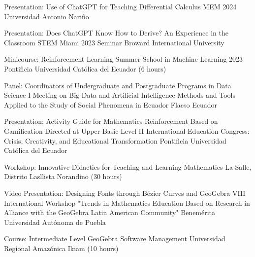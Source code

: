 \documentclass[
    a4paper,
    maincolor=cvblue!70!blue,
    sidecolor=gray!30,
    sectioncolor=cvblue!70!blue,
    sidebarwidth=7.5cm,
    topbottommargin=20pt,
    leftrightmargin=20pt,
]{fortysecondscv}
\begin{document}
    {Presentation: Use of ChatGPT for Teaching Differential Calculus}
    {MEM 2024}
    {Universidad Antonio Nariño}
    
    
    {Presentation: Does ChatGPT Know How to Derive? An Experience in the Classroom}
    {STEM Miami 2023 Seminar}
    {Broward International University}
    
    
    {Minicourse: Reinforcement Learning}
    {Summer School in Machine Learning 2023}
    {Pontificia Universidad Católica del Ecuador (6 hours)}
    
    
    {Panel: Coordinators of Undergraduate and Postgraduate Programs in Data Science}
    {I Meeting on Big Data and Artificial Intelligence Methods and Tools Applied to the Study of Social Phenomena in Ecuador}
    {Flacso Ecuador}
    
    {Presentation: Activity Guide for Mathematics Reinforcement Based on Gamification Directed at Upper Basic Level}
    {II International Education Congress: Crisis, Creativity, and Educational Transformation}
    {Pontificia Universidad Católica del Ecuador}
    
    {Workshop: Innovative Didactics for Teaching and Learning Mathematics}
    {}
    {La Salle, Distrito Lasllista Norandino (30 hours)}
    
    {Video Presentation: Designing Fonts through Bézier Curves and GeoGebra}
    {VIII International Workshop "Trends in Mathematics Education Based on Research in Alliance with the GeoGebra Latin American Community"}
    {Benemérita Universidad Autónoma de Puebla}
    

    {Course: Intermediate Level GeoGebra Software Management}
    {}
    {Universidad Regional Amazónica Ikiam (10 hours)}
    
    

    
    
\end{document}
